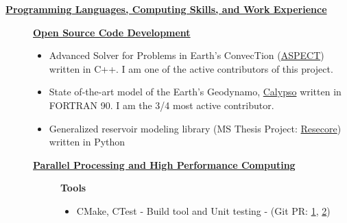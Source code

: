 \documentclass[11pt]{ltxdoc}
\begin{document}
\vskip 18pt

\begin{center}
	\textbf{\underline{Programming Languages, Computing Skills, and Work Experience}}
\end{center}


  \begin{description}
  	
    \item[] \textbf{\underline{Open Source Code Development}}
    
      \begin{itemize}
      	
        \item Advanced Solver for Problems in Earth's ConvecTion (\href{https://github.com/geodynamics/aspect}{ASPECT}) written in C++. I am one of the active contributors of this project.
      
      \item State of-the-art model of the Earth's Geodynamo,
      \href{https://geodynamics.org/cig/software/calypso/}{Calypso} written in FORTRAN 90. I am the 3/4 most active contributor.
      
      \item Generalized reservoir modeling library (MS Thesis Project: \href{https://github.com/hlokavarapu/resecore.git}{Resecore}) written in Python
            
    \end{itemize}
                                            
    \item[] \textbf{\underline{Parallel Processing and High Performance Computing}}
          
      \vskip 06pt
      
      \begin{description}
    
    	\item[] \textbf{Tools}
     
        \vskip 06pt   
        
        \begin{itemize} 
        
          \item CMake, CTest - Build tool and Unit testing - (Git PR: \href{https://github.com/hlokavarapu/computational_tools/tree/master/ASPECT_build_scripts}{1}, \href{https://github.com/geodynamics/calypso/pull/4}{2})
      

\end{itemize}
\end{description}
\end{description}
\end{document}
